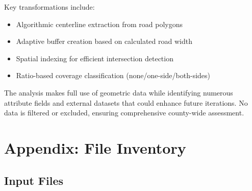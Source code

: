\documentclass[11pt,letterpaper]{article}
\begin{document}
Key transformations include:
\begin{itemize}
    \item Algorithmic centerline extraction from road polygons
    \item Adaptive buffer creation based on calculated road width
    \item Spatial indexing for efficient intersection detection
    \item Ratio-based coverage classification (none/one-side/both-sides)
\end{itemize}

The analysis makes full use of geometric data while identifying numerous attribute fields and external datasets that could enhance future iterations. No data is filtered or excluded, ensuring comprehensive county-wide assessment.

\section{Appendix: File Inventory}

\subsection{Input Files}
\end{document}
